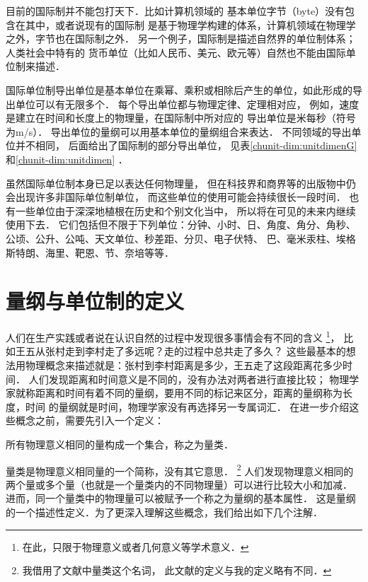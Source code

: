 \noindent{}目前的国际制并不能包打天下．比如计算机领域的
基本单位{\kaishu 字节}（byte）没有包含在其中，或者说现有的国际制
是基于物理学构建的体系，计算机领域在物理学之外，{\kaishu 字节}也在国际制之外．
另一个例子，国际制是描述自然界的单位制体系；人类社会中特有的
货币单位（比如人民币、美元、欧元等）自然也不能由国际单位制来描述．

国际单位制导出单位是基本单位在乘幂、乘积或相除后产生的单位，如此形成的导出单位可以有无限多个．
每个导出单位都与物理定律、定理相对应，
例如，速度是建立在时间和长度上的物理量，在国际制中所对应的
导出单位是{\kaishu 米每秒}（符号为\si{m/s}）．
导出单位的量纲可以用基本单位的量纲组合来表达．
不同领域的导出单位并不相同，
后面给出了国际制的部分导出单位，
见表\ref{chunit-dim:unitdimenG} 和\ref{chunit-dim:unitdimen} ．

虽然国际单位制本身已足以表达任何物理量，
但在科技界和商界等的出版物中仍会出现许多非国际单位制单位，
而这些单位的使用可能会持续很长一段时间．
也有一些单位由于深深地植根在历史和个别文化当中，
所以将在可见的未来内继续使用下去．
它们包括但不限于下列单位：分钟、小时、日、角度、角分、角秒、
公顷、公升、公吨、天文单位、秒差距、分贝、电子伏特、
巴、毫米汞柱、埃格斯特朗、海里、靶恩、节、奈培等等．



\section{量纲与单位制的定义}
人们在生产实践或者说在认识自然的过程中发现很多事情会有不同的含义
{\footnote{在此，只限于物理意义或者几何意义等学术意义．}}，
比如王五从张村走到李村走了{\kaishu 多远}呢？走的过程中总共走了{\kaishu 多久}？
这些最基本的想法用物理概念来描述就是：张村到李村{\kaishu 距离}是多少，王五走了这段距离花多少{\kaishu 时间}．
人们发现距离和时间意义是不同的，没有办法对两者进行直接比较；
物理学家就称距离和时间有着不同的量纲，要用不同的标记来区分，距离的量纲称为{\kaishu 长度}，时间
的量纲就是{\kaishu 时间}，物理学家没有再选择另一专属词汇．
在进一步介绍这些概念之前，需要先引入一个定义：

\begin{definition}\label{chunit-dim:quantity-class}
    所有物理意义相同的量构成一个集合，称之为{\heiti 量类}．
\end{definition}
量类是物理意义相同量的一个简称，没有其它意思．
{\footnote{ 我借用了文献\parencite[\S 1.1]{liang_cao2020}中{\kaishu 量类}这个名词，
        此文献的定义与我的定义略有不同．}}
人们发现物理意义相同的两个量或多个量（也就是一个量类内的不同物理量）可以进行比较大小和加减．
进而，同一个量类中的物理量可以被赋予一个称之为{\kaishu 量纲}的基本属性．
这是量纲的一个描述性定义．为了更深入理解这些概念，我们给出如下几个注解．

